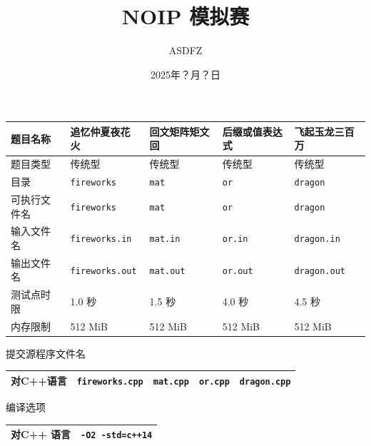 \documentclass[12pt,a4paper,oneside]{ctexart}
\newcommand{\ChineseprobA}{追忆仲夏夜花火}
\newcommand{\ChineseprobB}{回文矩阵矩文回}
\newcommand{\ChineseprobC}{后缀或值表达式}
\newcommand{\ChineseprobD}{飞起玉龙三百万}
\newcommand{\probA}{fireworks}
\newcommand{\probB}{mat}
\newcommand{\probC}{or}
\newcommand{\probD}{dragon}
\begin{document}
  \title{\heiti{} NOIP 模拟赛}
  \author{ASDFZ}
  \date{2025年？月？日}
  \maketitle
  \begin{center}
    \begin{tabularx}{\textwidth}{|X|X|X|X|X|}
    \hline
    题目名称 & \ChineseprobA & \ChineseprobB & \ChineseprobC & \ChineseprobD\\
    \hline
    题目类型 & 传统型 & 传统型 & 传统型 & 传统型\\
    \hline
    目录 & \texttt{\probA} & \texttt{\probB} & \texttt{\probC} & \texttt{\probD}\\
    \hline
    可执行文件名 & \texttt{\probA} & \texttt{\probB} & \texttt{\probC} & \texttt{\probD}\\
    \hline
    输入文件名 & \texttt{\probA.in} & \texttt{\probB.in} & \texttt{\probC.in} & \texttt{\probD.in}\\
    \hline
    输出文件名 & \texttt{\probA.out} & \texttt{\probB.out} & \texttt{\probC.out} & \texttt{\probD.out}\\
    \hline
    测试点时限 & 1.0 秒 & 1.5 秒 & 4.0 秒 & 4.5 秒\\
    \hline
    内存限制 & 512 MiB & 512 MiB & 512 MiB & 512 MiB\\
    \hline
    \end{tabularx}
  \end{center}
  \hspace{2em}提交源程序文件名
  \begin{center}
    \begin{tabularx}{\textwidth}{|X|X|X|X|X|}
    \hline
    对C++语言 & \texttt{\probA.cpp} & \texttt{\probB.cpp} & \texttt{\probC.cpp} & \texttt{\probD.cpp}\\
    \hline
    \end{tabularx}
  \end{center}
  \hspace{2em}编译选项
  \begin{center}
    \begin{tabularx}{\textwidth}{|p{100pt}|X<{\centering}|}
    \hline
    对C++ 语言 & \texttt{-O2 -std=c++14} \\
    \hline
    \end{tabularx}
  \end{center}
  \vspace{.8em}
  \hspace{1em}{\heiti 注意事项与提醒：}
\end{document}
